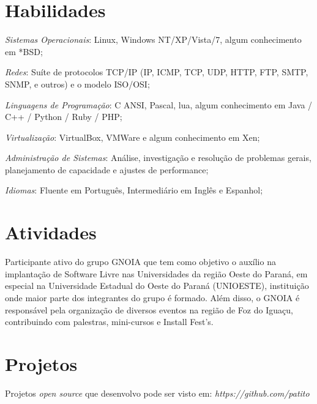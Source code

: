 \documentclass[margin]{res}
\begin{document}
\begin{resume}
\section{Habilidades}  \textit{Sistemas Operacionais}:  Linux, Windows NT/XP/Vista/7, algum conhecimento em *BSD;

			\textit{Redes}:  Suíte de protocolos TCP/IP (IP, ICMP, TCP, UDP, HTTP, FTP, SMTP, SNMP, e outros) e o modelo ISO/OSI;
  
			\textit{Linguagens de Programação}: C ANSI, Pascal, lua, algum conhecimento em Java / C++ / Python / Ruby / PHP;
  
			\textit{Virtualização}: VirtualBox, VMWare e algum conhecimento em Xen;

			\textit{Administração de Sistemas}:  Análise, investigação e resolução de problemas gerais, planejamento de capacidade e ajustes de performance;

			\textit{Idiomas}: Fluente em Português, Intermediário em Inglês e Espanhol;

 


\section{Atividades}
                Participante ativo do grupo GNOIA que tem como objetivo o auxílio na implantação de Software Livre nas Universidades da região Oeste do Paraná, em especial na Universidade Estadual do Oeste do Paraná (UNIOESTE), instituição onde maior parte dos integrantes do grupo é formado. Além disso, o GNOIA é responsável pela organização de diversos eventos na região de Foz do Iguaçu, contribuindo com palestras, mini-cursos e Install Fest's.
 
\section{Projetos}
		Projetos \textit{open source} que desenvolvo pode ser visto em: \textit{https://github.com/patito}
 
\end{resume} 
\end{document}
